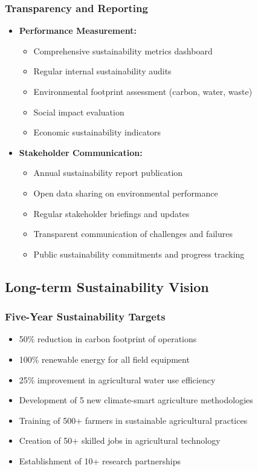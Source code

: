 \subsubsection{Transparency and Reporting}
\begin{itemize}
    \item \textbf{Performance Measurement:}
    \begin{itemize}
        \item Comprehensive sustainability metrics dashboard
        \item Regular internal sustainability audits
        \item Environmental footprint assessment (carbon, water, waste)
        \item Social impact evaluation
        \item Economic sustainability indicators
    \end{itemize}
    
    \item \textbf{Stakeholder Communication:}
    \begin{itemize}
        \item Annual sustainability report publication
        \item Open data sharing on environmental performance
        \item Regular stakeholder briefings and updates
        \item Transparent communication of challenges and failures
        \item Public sustainability commitments and progress tracking
    \end{itemize}
\end{itemize}

\subsection{Long-term Sustainability Vision}

\subsubsection{Five-Year Sustainability Targets}
\begin{itemize}
    \item 50\% reduction in carbon footprint of operations
    \item 100\% renewable energy for all field equipment
    \item 25\% improvement in agricultural water use efficiency
    \item Development of 5 new climate-smart agriculture methodologies
    \item Training of 500+ farmers in sustainable agricultural practices
    \item Creation of 50+ skilled jobs in agricultural technology
    \item Establishment of 10+ research partnerships
\end{itemize}


